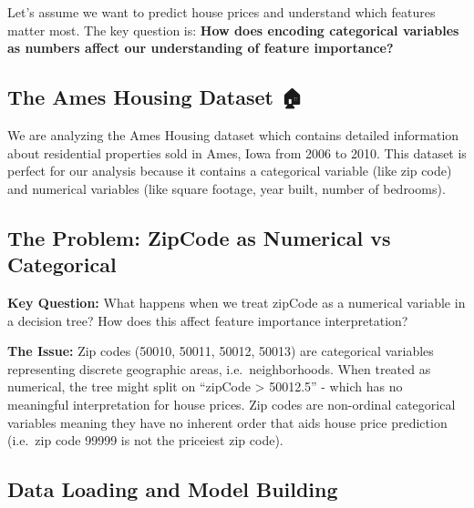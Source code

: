 \documentclass[
  letterpaper,
  DIV=11,
  numbers=noendperiod]{scrartcl}
\begin{document}
Let's assume we want to predict house prices and understand which
features matter most. The key question is: \textbf{How does encoding
categorical variables as numbers affect our understanding of feature
importance?}

\subsection{The Ames Housing Dataset 🏠}\label{the-ames-housing-dataset}

We are analyzing the Ames Housing dataset which contains detailed
information about residential properties sold in Ames, Iowa from 2006 to
2010. This dataset is perfect for our analysis because it contains a
categorical variable (like zip code) and numerical variables (like
square footage, year built, number of bedrooms).

\subsection{The Problem: ZipCode as Numerical vs
Categorical}\label{the-problem-zipcode-as-numerical-vs-categorical}

\textbf{Key Question:} What happens when we treat zipCode as a numerical
variable in a decision tree? How does this affect feature importance
interpretation?

\textbf{The Issue:} Zip codes (50010, 50011, 50012, 50013) are
categorical variables representing discrete geographic areas,
i.e.~neighborhoods. When treated as numerical, the tree might split on
``zipCode \textgreater{} 50012.5'' - which has no meaningful
interpretation for house prices. Zip codes are non-ordinal categorical
variables meaning they have no inherent order that aids house price
prediction (i.e.~zip code 99999 is not the priceiest zip code).

\subsection{Data Loading and Model
Building}\label{data-loading-and-model-building}
\end{document}
